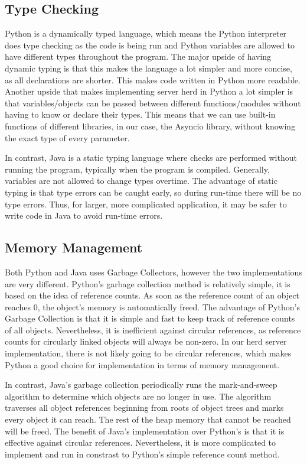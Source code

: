 \subsection{Type Checking}
Python is a dynamically typed language, which means the Python interpreter does type checking as the code is being run and Python variables are allowed to have different types throughout the program. The major upside of having dynamic typing is that this makes the language a lot simpler and more concise, as all declarations are shorter. This makes code written in Python more readable. Another upside that makes implementing server herd in Python a lot simpler is that variables/objects can be passed between different functions/modules without having to know or declare their types. This means that we can use built-in functions of different libraries, in our case, the Asyncio library, without knowing the exact type of every parameter. \par
In contrast, Java is a static typing language where checks are performed without running the program, typically when the program is compiled. Generally, variables are not allowed to change types overtime. The advantage of static typing is that type errors can be caught early, so during run-time there will be no type errors. Thus, for larger, more complicated application, it may be safer to write code in Java to avoid run-time errors. 
\subsection{Memory Management}
Both Python and Java uses Garbage Collectors, however the two implementations are very different. Python's garbage collection method is relatively simple, it is based on the idea of reference counts. As soon as the reference count of an object reaches 0, the object's memory is automatically freed. The advantage of Python's Garbage Collection is that it is simple and fast to keep track of reference counts of all objects. Nevertheless, it is inefficient against circular references, as reference counts for circularly linked objects will always be non-zero. In our herd server implementation, there is not likely going to be circular references, which makes Python a good choice for implementation in terms of memory management.\par
In contrast, Java's garbage collection periodically runs the mark-and-sweep algorithm to determine which objects are no longer in use. The algorithm traverses all object references beginning from roots of object trees and marks every object it can reach. The rest of the heap memory that cannot be reached will be freed. The benefit of Java's implementation over Python's is that it is effective against circular references. Nevertheless, it is more complicated to implement and run in constrast to Python's simple reference count method.
